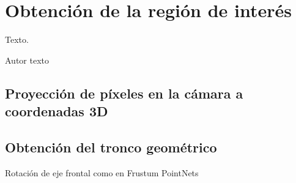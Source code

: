 \chapter{Obtención de la región de interés}
\label{cha:Obtención de la región de interés}

\begin{FraseCelebre}
  \begin{Frase}
    Texto.
  \end{Frase}
  \begin{Fuente}
    Autor texto
  \end{Fuente}
\end{FraseCelebre}

\section{Proyección de píxeles en la cámara a coordenadas 3D}
\label{sec:Proyección de píxeles en la cámara a coordenadas 3D}

\section{Obtención del tronco geométrico}
\label{sec:Obtención del tronco geométrico}

Rotación de eje frontal como en Frustum PointNets